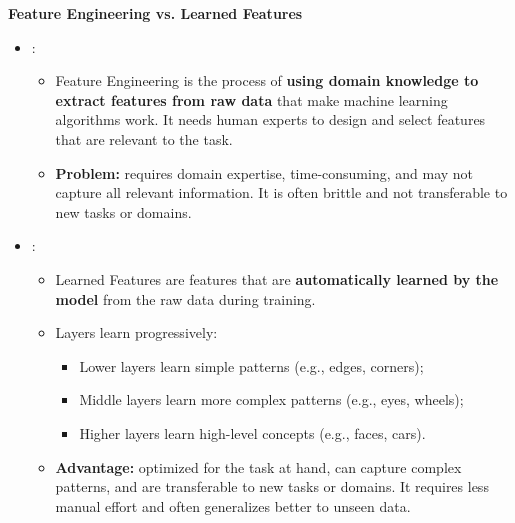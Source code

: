 \highspace
\begin{flushleft}
    \textcolor{Green3}{ \textbf{Feature Engineering vs. Learned Features}}
\end{flushleft}
\begin{itemize}
    \item {}:
    \begin{itemize}
        \item Feature Engineering is the process of \textbf{using domain knowledge to extract features from raw data} that make machine learning algorithms work. It needs human experts to design and select features that are relevant to the task.
        \item \textbf{Problem:} requires domain expertise, time-consuming, and may not capture all relevant information. It is often brittle and not transferable to new tasks or domains.
    \end{itemize}


    \item {}:
    \begin{itemize}
        \item Learned Features are features that are \textbf{automatically learned by the model} from the raw data during training.
        \item Layers learn progressively:
        \begin{itemize}
            \item Lower layers learn simple patterns (e.g., edges, corners);
            \item Middle layers learn more complex patterns (e.g., eyes, wheels);
            \item Higher layers learn high-level concepts (e.g., faces, cars).
        \end{itemize}
        \item \textbf{Advantage:} optimized for the task at hand, can capture complex patterns, and are transferable to new tasks or domains. It requires less manual effort and often generalizes better to unseen data.
    \end{itemize}
\end{itemize}

